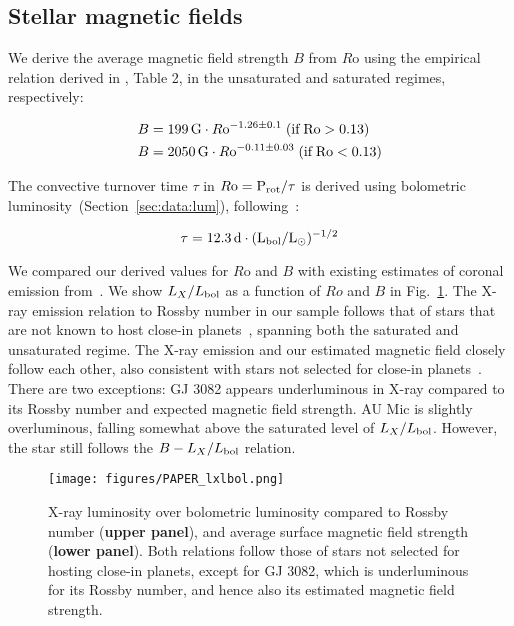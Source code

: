 \documentclass[twocolumn]{aastex631}
\begin{document}
\subsection{Stellar magnetic fields}
\label{sec:methods:bfield}
We derive the average magnetic field strength $B$ from $R$o using the empirical relation derived in \citet{reiners2022magnetism},  Table 2, in the unsaturated and saturated regimes, respectively:

\begin{eqnarray}
    B &= 199\,\text{G} \cdot R\rm o^{-1.26\pm 0.1} \;(\text{if}\; Ro > 0.13) \\
    B &= 2050\,\text{G} \cdot R\rm o^{-0.11\pm 0.03} \;(\text{if}\; Ro < 0.13) 
\end{eqnarray}

The convective turnover time $\tau$ in  $R \rm o=P_{rot}/\tau$ is derived using bolometric luminosity~(Section~\ref{sec:data:lum}), following~\citet{reiners2014generalized, reiners2022magnetism}:

\begin{equation}
    \tau = 12.3\, \rm d \cdot (L_{\rm bol}/L_\odot)^{-1/2}
\end{equation}

We compared our derived values for $R$o and $B$ with existing estimates of coronal emission from~\citet{foster2022exoplanet}. We show $L_X/L_{\rm bol}$ as a function of $Ro$ and $B$ in Fig.~\ref{fig:lx}. The X-ray emission relation to Rossby number in our sample follows that of stars that are not known to host close-in planets~\citep{wright2011stellaractivityrotation}, spanning both the saturated and unsaturated regime. The X-ray emission and our estimated magnetic field closely follow each other, also consistent with stars not selected for close-in planets~\citep{reiners2022magnetism}. There are two exceptions: GJ 3082 appears underluminous in X-ray compared to its Rossby number and expected magnetic field strength. AU Mic is slightly overluminous, falling somewhat above the saturated level of $L_X/L_{\rm bol}$. However, the star still follows the $B-L_X/L_{\rm bol}$ relation.  

\begin{figure}[ht!]
    \begin{centering}
        \texttt{[image: figures/PAPER\_lxlbol.png]}
        \caption{
           X-ray luminosity over bolometric luminosity compared to Rossby number (\textbf{upper panel}), and average surface magnetic field strength (\textbf{lower panel}). Both relations follow those of stars not selected for hosting close-in planets, except for GJ 3082, which is underluminous for its Rossby number, and hence also its estimated magnetic field strength.
        }
        \label{fig:lx}
    \end{centering}
\end{figure}
\end{document}
